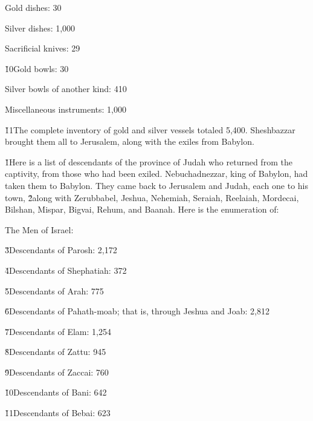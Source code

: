 Gold dishes: 30

Silver dishes: 1,000

Sacrificial knives: 29

\v{10}Gold bowls: 30

Silver bowls of another kind: 410

Miscellaneous instruments: 1,000

\v{11}The complete inventory of gold and silver vessels totaled 5,400. Sheshbazzar brought them all to Jerusalem, along with the exiles from Babylon.

\v{1}Here is a list of descendants of the province of Judah who returned from the captivity, from those who had been exiled. Nebuchadnezzar, king of Babylon, had taken them to Babylon. They came back to Jerusalem and Judah, each one to his town, \v{2}along with Zerubbabel, Jeshua, Nehemiah, Seraiah, Reelaiah, Mordecai, Bilshan, Mispar, Bigvai, Rehum, and Baanah. Here is the enumeration of:

The Men of Israel:

\v{3}Descendants of Parosh: 2,172

\v{4}Descendants of Shephatiah: 372

\v{5}Descendants of Arah: 775

\v{6}Descendants of Pahath-moab; that is, through Jeshua and Joab: 2,812

\v{7}Descendants of Elam: 1,254

\v{8}Descendants of Zattu: 945

\v{9}Descendants of Zaccai: 760

\v{10}Descendants of Bani: 642

\v{11}Descendants of Bebai: 623


